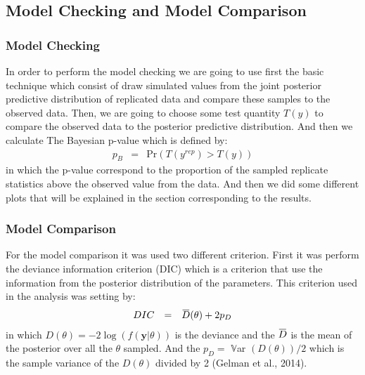 \documentclass{asaproc}
\newcommand{\overbar}[1]{\mkern 1.5mu\overline{\mkern-1.5mu#1\mkern-1.5mu}\mkern 1.5mu}
\begin{document}
\subsection{Model Checking and Model Comparison}

\subsubsection{Model Checking}
In order to perform the model checking we are going to use first the basic technique which consist of draw simulated values from the joint posterior predictive distribution of replicated data and compare these samples to the observed data. Then, we are going to choose some test quantity $T(y)$ to compare the observed data to the posterior predictive distribution. And then we calculate The Bayesian p-value which is defined by:
\begin{equation*}
\begin{array}{lclll}
p_B & = & \mbox{Pr}(T(y^{rep})>T(y))
\end{array}
\end{equation*}
\noindent
in which the p-value correspond to the proportion of the sampled replicate statistics above the observed value from the data. And then we did some different plots that will be explained in the section corresponding to the results.

\subsubsection{Model Comparison}
For the model comparison it was used two different criterion. First it was perform the deviance information criterion (DIC) which is a criterion that use the information from the posterior distribution of the parameters. This criterion used in the analysis was setting by:
\begin{equation*}
\begin{array}{lclll}
DIC & = & \overbar{D}(\theta) + 2p_{D}\\
\end{array}
\end{equation*}
\noindent
in which $D(\theta) =  -2\log(f(\textbf{y}|\theta))$ is the deviance and the $\overbar{D}$ is the mean of the posterior over all the $\theta$ sampled. And the $p_{D} =$ $\mathds{V}$ar $(D(\theta))/2$ which is the sample variance of the $D(\theta)$ divided by 2 (Gelman et al., 2014).
\end{document}
